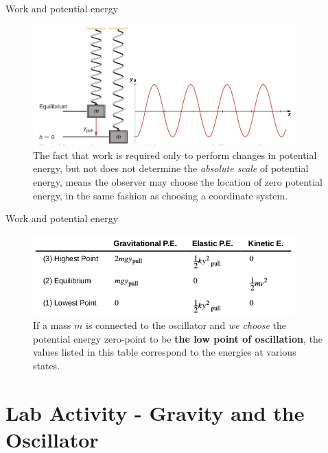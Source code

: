 \documentclass{beamer}
\begin{document}
\begin{frame}{Work and potential energy}
\begin{figure}
\centering
\includegraphics[width=0.9\textwidth,trim=0cm 0.1cm 0cm 0cm,clip=true]{figures/osc.png}
\caption{\label{fig:osc3} The fact that work is required only to perform changes in potential energy, but not does not determine the \textit{absolute scale} of potential energy, means the observer \alert{may choose the location of zero potential energy}, in the same fashion as choosing a coordinate system.}
\end{figure}
\end{frame}

\begin{frame}{Work and potential energy}
\begin{figure}
\centering
\includegraphics[width=0.9\textwidth,trim=0cm 0.1cm 0cm 0cm,clip=true]{figures/table.png}
\caption{\label{fig:osc4} If a mass $m$ is connected to the oscillator and \textit{we choose} the potential energy zero-point to be \textbf{the low point of oscillation}, the values listed in this table correspond to the energies at various states.}
\end{figure}
\end{frame}

\section{Lab Activity - Gravity and the Oscillator}
\end{document}
